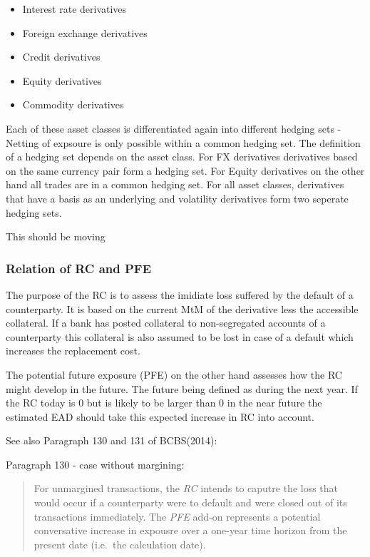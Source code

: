\begin{itemize}
\tightlist
\item
  Interest rate derivatives
\item
  Foreign exchange derivatives
\item
  Credit derivatives
\item
  Equity derivatives
\item
  Commodity derivatives
\end{itemize}

Each of these asset classes is differentiated again into different
hedging sets - Netting of expsoure is only possible within a common
hedging set. The definition of a hedging set depends on the asset class.
For FX derivatives derivatives based on the same currency pair form a
hedging set. For Equity derivatives on the other hand all trades are in
a common hedging set. For all asset classes, derivatives that have a
basis as an underlying and volatility derivatives form two seperate
hedging sets.

This should be moving

    \hypertarget{relation-of-rc-and-pfe}{%
\subsubsection{Relation of RC and PFE}\label{relation-of-rc-and-pfe}}

The purpose of the RC is to assess the imidiate loss suffered by the
default of a counterparty. It is based on the current MtM of the
derivative less the accessible collateral. If a bank has posted
collateral to non-segregated accounts of a counterparty this collateral
is also assumed to be lost in case of a default which increases the
replacement cost.

The potential future exposure (PFE) on the other hand assesses how the
RC might develop in the future. The future being defined as during the
next year. If the RC today is 0 but is likely to be larger than 0 in the
near future the estimated EAD should take this expected increase in RC
into account.

See also Paragraph 130 and 131 of BCBS(2014):

Paragraph 130 - case without margining:

\begin{quote}
For unmargined transactions, the \emph{RC} intends to caputre the loss
that would occur if a counterparty were to default and were closed out
of its transactions immediately. The \emph{PFE} add-on represents a
potential conversative increase in expousre over a one-year time horizon
from the present date (i.e.~the calculation date).
\end{quote}

